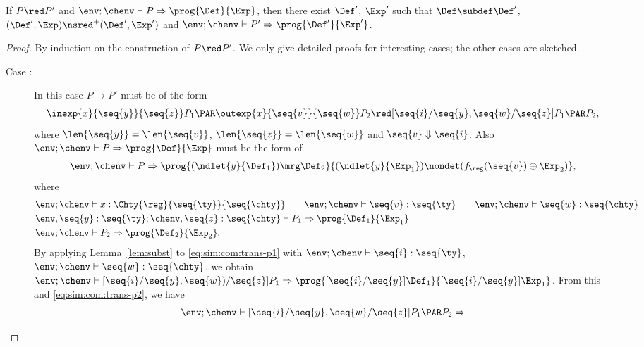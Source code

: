 \begin{lemma} \label{lem:simulate}
    If $P \red P'$ and $\env; \chenv \vdash P \Rightarrow \prog{\Def}{\Exp}$,
    then there exist $\Def'$, $\Exp'$ such that \( \Def \subdef \Def' \),
    \( (\Def', \Exp) \nsred^+ (\Def', \Exp') \)
    and $\env; \chenv \vdash P' \Rightarrow \prog{\Def'}{\Exp'}$.
\end{lemma}
\begin{proof}
    By induction on the construction of \( P \red P' \).
    We only give detailed proofs for  interesting cases; the other cases are sketched.

\begin{description}
    \item[Case :]
    In this case $P \to P'$ must be of the form
    \begin{align*}
    \inexp{x}{\seq{y}}{\seq{z}}P_1 \PAR \outexp{x}{\seq{v}}{\seq{w}}P_2 \red [\seq{i}/ \seq{y} ,\seq{w} / \seq{z}]P_1 \PAR P_2,
    \end{align*}
    where
    $\len{\seq{y}} = \len{\seq{v}}$,
    $\len{\seq{z}} = \len{\seq{w}}$
    and $\seq{v} \Downarrow \seq{i}$.
    Also $\env; \chenv \vdash P \Rightarrow \prog{\Def}{\Exp}$ must be the form of
    \begin{align*}
      \env; \chenv \vdash P \Rightarrow
      \prog{(\ndlet{y}{\Def_1}) \mrg \Def_2}{(\ndlet{y}{\Exp_1}) \nondet (f_\reg(\seq{v}) \oplus \Exp_2)},
    \end{align*}
    where
    \begin{align}
    &\env; \chenv \vdash x : \Chty{\reg}{\seq{\ty}}{\seq{\chty}}
    \qquad \env; \chenv \vdash \seq{v} : \seq{\ty}
    \qquad \env; \chenv \vdash \seq{w} : \seq{\chty} \nonumber \\
    &\env, \seq{y} : \seq{\ty}; \chenv, \seq{z} : \seq{\chty} \vdash P_1 \Rightarrow
    \prog{\Def_1}{\Exp_1} \label{eq:sim:com:trans-p1} \\
    & \env; \chenv \vdash P_2 \Rightarrow \prog{\Def_2}{\Exp_2}. \label{eq:sim:com:trans-p2}
    \end{align}
    By applying Lemma~\ref{lem:subst} to \eqref{eq:sim:com:trans-p1} with
    $\env; \chenv \vdash \seq{i} : \seq{\ty}$,
    $\env; \chenv \vdash \seq{w} : \seq{\chty}$,
    we obtain
    $\env; \chenv \vdash [\seq{i} / \seq{y}, \seq{w})/\seq{z}]P_1 \Rightarrow
    \prog{[\seq{i}/\seq{y}]\Def_1}{[\seq{i}/\seq{y}]\Exp_1}$.
    From this and \eqref{eq:sim:com:trans-p2}, we have
    \begin{align*}
      \env; \chenv \vdash [\seq{i}/ \seq{y}, \seq{w}/ \seq{z}]P_1 \PAR P_2 \Rightarrow

\end{align*}
\end{description}
\end{proof}
